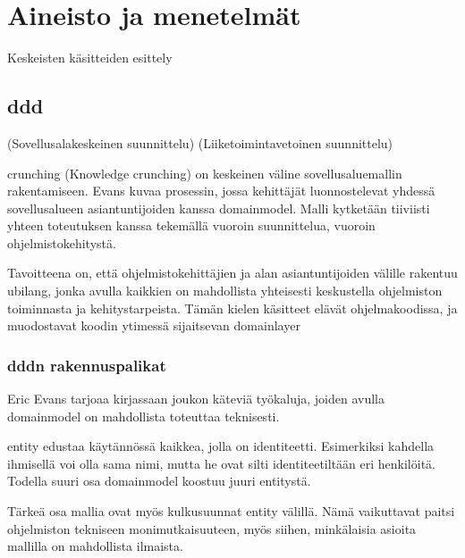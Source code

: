 \vspace{21.5pt}

\hypertarget{aineisto-ja-menetelmuxe4t}{%
\section{Aineisto ja menetelmät}\label{aineisto-ja-menetelmuxe4t}}

Keskeisten käsitteiden esittely

\hypertarget{section}{%
\subsection{\texorpdfstring{\gls{ddd}}{}}\label{section}}

(Sovellusalakeskeinen suunnittelu) (Liiketoimintavetoinen suunnittelu)

\gls{crunching} (Knowledge crunching) on keskeinen väline
sovellusaluemallin rakentamiseen. Evans kuvaa prosessin, jossa
kehittäjät luonnostelevat yhdessä sovellusalueen asiantuntijoiden kanssa
\gls{domainmodel}. Malli kytketään tiiviisti yhteen toteutuksen kanssa
tekemällä vuoroin suunnittelua, vuoroin ohjelmistokehitystä.
\cite[p. 13]{evans:ddd}

Tavoitteena on, että ohjelmistokehittäjien ja alan asiantuntijoiden
välille rakentuu \gls{ubilang}, jonka avulla kaikkien on mahdollista
yhteisesti keskustella ohjelmiston toiminnasta ja kehitystarpeista.
Tämän kielen käsitteet elävät ohjelmakoodissa, ja muodostavat koodin
ytimessä sijaitsevan \gls{domainlayer}

\hypertarget{n-rakennuspalikat}{%
\subsubsection{\texorpdfstring{\gls{ddd}n
rakennuspalikat}{n rakennuspalikat}}\label{n-rakennuspalikat}}

Eric Evans tarjoaa kirjassaan joukon käteviä työkaluja, joiden avulla
\gls{domainmodel} on mahdollista toteuttaa teknisesti.

\gls{entity} edustaa käytännössä kaikkea, jolla on identiteetti.
Esimerkiksi kahdella ihmisellä voi olla sama nimi, mutta he ovat silti
identiteetiltään eri henkilöitä. Todella suuri osa \gls{domainmodel}
koostuu juuri \gls{entity}stä.

Tärkeä osa mallia ovat myös kulkusuunnat \gls{entity} välillä. Nämä
vaikuttavat paitsi ohjelmiston tekniseen monimutkaisuuteen, myös siihen,
minkälaisia asioita mallilla on mahdollista ilmaista.

